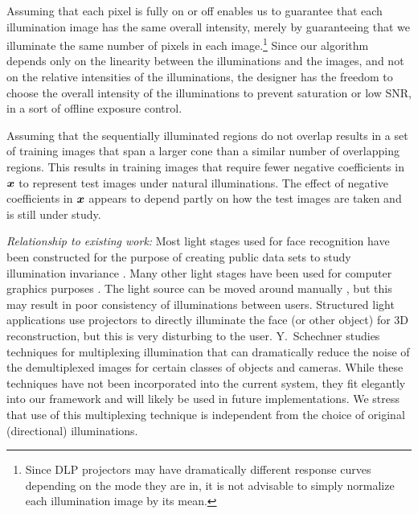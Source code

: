 \documentclass[12pt,journal,draftcls,letterpaper,onecolumn]{IEEEtran}
\begin{document}
Assuming that each pixel is fully on or off enables us to guarantee
that each illumination image has the same overall intensity, merely
by guaranteeing that we illuminate the same number of pixels in each image.\footnote{Since DLP projectors may have dramatically different response
curves depending on the mode they are in, it is not advisable to simply normalize each illumination image by its mean.}
Since our algorithm depends only on  the
linearity between the illuminations and the images, and not on the
relative intensities of the illuminations, the designer has the freedom to choose the overall intensity of the illuminations
to prevent saturation or low SNR, in a sort of offline exposure control.


Assuming that the sequentially illuminated regions do not overlap results in a
set of training images that span a larger cone than a similar number of
overlapping regions.  This results in training images that require fewer
negative coefficients in ${\boldsymbol{x}}$ to represent test images under natural
illuminations.  The effect of negative coefficients in ${\boldsymbol{x}}$ appears to depend
partly on how the test images are taken and is still under study.

{\em Relationship to existing work:} Most light stages used for face recognition have
been constructed for the purpose of creating public data sets to study
illumination invariance \cite{Georghiades2001-PAMI, Gross2008-FGR}.  Many other
light stages have been used for computer graphics purposes
\cite{debevec2000acquiring, jones2005performance}.
The light source can be
moved around manually \cite{masselus2002free}, but this may result in poor
consistency of illuminations between users.  Structured light applications use projectors to
directly illuminate the face (or other object) \cite{zhang2002rapid} for 3D
reconstruction, but this is very disturbing to the user. 
Y.\ Schechner \cite{schechner2007multiplexing}
studies techniques for multiplexing illumination that can dramatically reduce the noise 
of the demultiplexed images for certain classes of objects and cameras.  
While these techniques have not been incorporated into the current
system, they fit elegantly into our framework and will likely be used
in future implementations.  We stress that use of this multiplexing technique
is independent from the choice of original (directional) illuminations.
\end{document}
